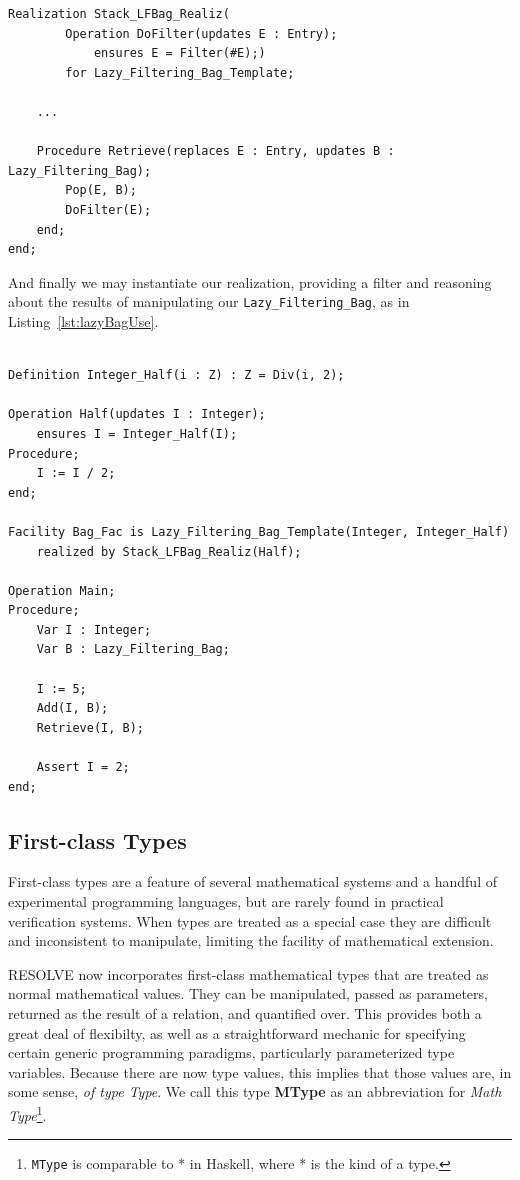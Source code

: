 \begin{lstlisting}[float=h,language=resolve,caption={A partial realization of \texttt{Lazy\_Filtering\_Bag}\label{lst:lazyBagImpl}}]
Realization Stack_LFBag_Realiz(
		Operation DoFilter(updates E : Entry);
			ensures E = Filter(#E);)
		for Lazy_Filtering_Bag_Template;

	...

	Procedure Retrieve(replaces E : Entry, updates B : Lazy_Filtering_Bag);
		Pop(E, B);
		DoFilter(E);
	end;
end;
\end{lstlisting}

And finally we may instantiate our realization, providing a filter and reasoning about the results of manipulating our \texttt{Lazy\_Filtering\_Bag}, as in Listing~\ref{lst:lazyBagUse}.

\begin{lstlisting}[float=h,language=resolve,caption={An example of instantiating and using a \texttt{Lazy\_Filtering\_Bag}\label{lst:lazyBagUse}}]

Definition Integer_Half(i : Z) : Z = Div(i, 2);

Operation Half(updates I : Integer);
	ensures I = Integer_Half(I); 
Procedure;
	I := I / 2;
end;

Facility Bag_Fac is Lazy_Filtering_Bag_Template(Integer, Integer_Half)
	realized by Stack_LFBag_Realiz(Half);

Operation Main;
Procedure;
	Var I : Integer;
	Var B : Lazy_Filtering_Bag;

	I := 5;
	Add(I, B);
	Retrieve(I, B);

	Assert I = 2;
end;
\end{lstlisting}

	\subsection{First-class Types\label{firstClassTypes}}

First-class types are a feature of several mathematical systems and a handful of experimental programming languages, but are rarely found in practical verification systems.  When types are treated as a special case they are difficult and inconsistent to manipulate, limiting the facility of mathematical extension.

RESOLVE now incorporates first-class mathematical types that are treated as normal mathematical values.  They can be manipulated, passed as parameters, returned as the result of a relation, and quantified over.  This provides both a great deal of flexibilty, as well as a straightforward mechanic for specifying certain generic programming paradigms, particularly parameterized type variables.  Because there are now type values, this implies that those values are, in some sense, \emph{of type Type}.  We call this type \textbf{MType} as an abbreviation for \emph{Math Type}\footnote{\texttt{MType} is comparable to * in Haskell, where * is the kind of a type.}.

